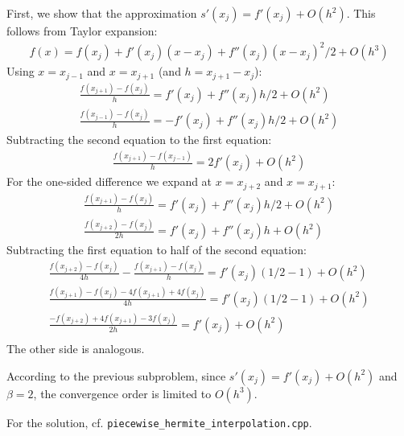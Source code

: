 \begin{problem}
\begin{subproblem}[1]
\cprotEnv \begin{solution}
   First, we show that the approximation $s'(x_j) = f'(x_j) + O(h^2)$. This follows from Taylor expansion:
   \begin{align*}
    f(x) = f(x_j) + f'(x_j) ( x - x_j ) + f''(x_j) (x - x_j)^2 / 2 + O(h^3)
   \end{align*}
  Using $x = x_{j-1}$ and $x = x_{j+1}$ (and $h = x_{j+1}- x_j$):
   \begin{align*}
    \frac{f(x_{j+1}) - f(x_{j})}{h} = f'(x_j) + f''(x_j) h / 2 + O(h^2) \\
    \frac{f(x_{j-1}) - f(x_{j})}{h} = -f'(x_j) + f''(x_j) h / 2 + O(h^2)
   \end{align*}
   Subtracting the second equation to the first equation:
   \begin{align*}
    \frac{f(x_{j+1}) - f(x_{j-1})}{h} = 2f'(x_j) + O(h^2)
   \end{align*}
   For the one-sided difference we expand at $x = x_{j+2}$ and $x = x_{j+1}$:
   \begin{align*}
    \frac{f(x_{j+1}) - f(x_{j})}{h} = f'(x_j) + f''(x_j) h / 2 + O(h^2) \\
    \frac{f(x_{j+2}) - f(x_{j})}{2h} = f'(x_j) + f''(x_j) h + O(h^2)
   \end{align*}
   Subtracting the first equation to half of the second equation:
   \begin{align*}
    \frac{f(x_{j+2}) - f(x_{j})}{4h} - \frac{f(x_{j+1}) - f(x_{j})}{h} = f'(x_j) (1/2 - 1) + O(h^2) \\
    \frac{f(x_{j+1}) - f(x_{j}) - 4 f(x_{j+1}) + 4 f(x_{j})}{4h} = f'(x_j) (1/2 - 1) + O(h^2) \\
    \frac{- f(x_{j+2}) + 4 f(x_{j+1}) - 3 f(x_{j})}{2h} = f'(x_j) + O(h^2) \\
   \end{align*}
   The other side is analogous.

   According to the previous subproblem, since $s'(x_j) = f'(x_j) + O(h^2)$ and $\beta = 2$, the convergence order is limited to $O(h^3)$.
   
   For the \Cpp{} solution, cf. \verb|piecewise_hermite_interpolation.cpp|.
  \end{solution}
 \end{subproblem}

 
\end{problem}
